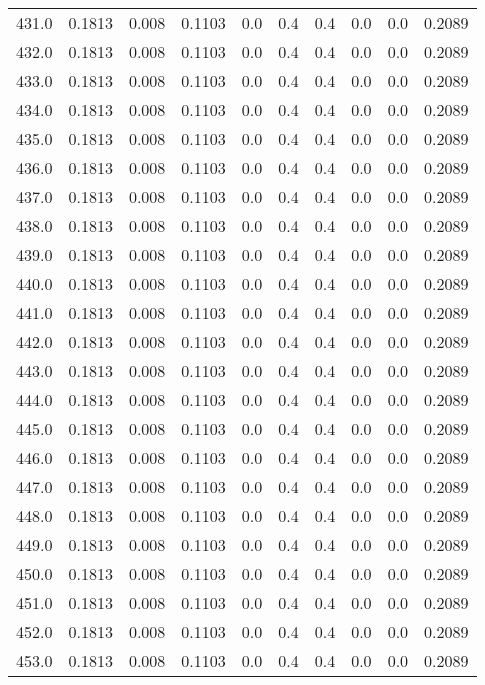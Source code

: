\begin{longtable}{lrrrrrrrrr}
431.0 & 0.1813 & 0.008 & 0.1103 & 0.0 & 0.4 & 0.4 & 0.0 & 0.0 & 0.2089 \\
432.0 & 0.1813 & 0.008 & 0.1103 & 0.0 & 0.4 & 0.4 & 0.0 & 0.0 & 0.2089 \\
433.0 & 0.1813 & 0.008 & 0.1103 & 0.0 & 0.4 & 0.4 & 0.0 & 0.0 & 0.2089 \\
434.0 & 0.1813 & 0.008 & 0.1103 & 0.0 & 0.4 & 0.4 & 0.0 & 0.0 & 0.2089 \\
435.0 & 0.1813 & 0.008 & 0.1103 & 0.0 & 0.4 & 0.4 & 0.0 & 0.0 & 0.2089 \\
436.0 & 0.1813 & 0.008 & 0.1103 & 0.0 & 0.4 & 0.4 & 0.0 & 0.0 & 0.2089 \\
437.0 & 0.1813 & 0.008 & 0.1103 & 0.0 & 0.4 & 0.4 & 0.0 & 0.0 & 0.2089 \\
438.0 & 0.1813 & 0.008 & 0.1103 & 0.0 & 0.4 & 0.4 & 0.0 & 0.0 & 0.2089 \\
439.0 & 0.1813 & 0.008 & 0.1103 & 0.0 & 0.4 & 0.4 & 0.0 & 0.0 & 0.2089 \\
440.0 & 0.1813 & 0.008 & 0.1103 & 0.0 & 0.4 & 0.4 & 0.0 & 0.0 & 0.2089 \\
441.0 & 0.1813 & 0.008 & 0.1103 & 0.0 & 0.4 & 0.4 & 0.0 & 0.0 & 0.2089 \\
442.0 & 0.1813 & 0.008 & 0.1103 & 0.0 & 0.4 & 0.4 & 0.0 & 0.0 & 0.2089 \\
443.0 & 0.1813 & 0.008 & 0.1103 & 0.0 & 0.4 & 0.4 & 0.0 & 0.0 & 0.2089 \\
444.0 & 0.1813 & 0.008 & 0.1103 & 0.0 & 0.4 & 0.4 & 0.0 & 0.0 & 0.2089 \\
445.0 & 0.1813 & 0.008 & 0.1103 & 0.0 & 0.4 & 0.4 & 0.0 & 0.0 & 0.2089 \\
446.0 & 0.1813 & 0.008 & 0.1103 & 0.0 & 0.4 & 0.4 & 0.0 & 0.0 & 0.2089 \\
447.0 & 0.1813 & 0.008 & 0.1103 & 0.0 & 0.4 & 0.4 & 0.0 & 0.0 & 0.2089 \\
448.0 & 0.1813 & 0.008 & 0.1103 & 0.0 & 0.4 & 0.4 & 0.0 & 0.0 & 0.2089 \\
449.0 & 0.1813 & 0.008 & 0.1103 & 0.0 & 0.4 & 0.4 & 0.0 & 0.0 & 0.2089 \\
450.0 & 0.1813 & 0.008 & 0.1103 & 0.0 & 0.4 & 0.4 & 0.0 & 0.0 & 0.2089 \\
451.0 & 0.1813 & 0.008 & 0.1103 & 0.0 & 0.4 & 0.4 & 0.0 & 0.0 & 0.2089 \\
452.0 & 0.1813 & 0.008 & 0.1103 & 0.0 & 0.4 & 0.4 & 0.0 & 0.0 & 0.2089 \\
453.0 & 0.1813 & 0.008 & 0.1103 & 0.0 & 0.4 & 0.4 & 0.0 & 0.0 & 0.2089 \\

\end{longtable}
